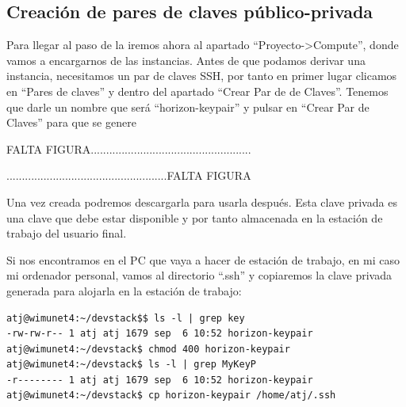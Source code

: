 \subsection{Creación de pares de claves público-privada}
Para llegar al paso de la %
iremos ahora al apartado  “Proyecto-\textgreater Compute”, donde vamos a encargarnos  de las instancias. Antes de que podamos derivar una instancia, necesitamos un par de claves SSH, por tanto en primer lugar clicamos en “Pares de claves” y dentro del apartado “Crear Par de de Claves”. Tenemos que darle un nombre que será “horizon-keypair” y pulsar en “Crear Par de Claves” para que se genere

\begin{tcolorbox}[colback=green!5!white,colframe=green!75!black]
FALTA FIGURA....................................................

....................................................FALTA FIGURA
\end{tcolorbox}

Una vez creada podremos descargarla para usarla después. Esta clave privada es una clave que debe estar disponible y por tanto almacenada en la estación de trabajo del usuario final.

Si nos encontramos en el PC que vaya a hacer de estación de trabajo, en mi caso mi ordenador personal, vamos al directorio “.ssh” y copiaremos la clave privada generada para alojarla en la estación de trabajo:

\begin{lstlisting}[style=Consola]
atj@wimunet4:~/devstack$$ ls -l | grep key
-rw-rw-r-- 1 atj atj 1679 sep  6 10:52 horizon-keypair
atj@wimunet4:~/devstack$ chmod 400 horizon-keypair
atj@wimunet4:~/devstack$ ls -l | grep MyKeyP
-r-------- 1 atj atj 1679 sep  6 10:52 horizon-keypair
atj@wimunet4:~/devstack$ cp horizon-keypair /home/atj/.ssh
\end{lstlisting}

